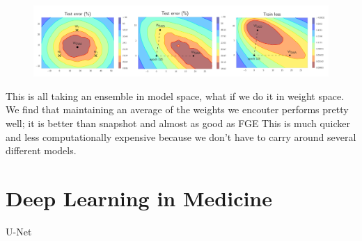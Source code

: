 \begin{figure}
    \centering
    \includegraphics[width=\textwidth]{./img/SWA.png}
    \caption{\cite{Izmailov_Podoprikhin_Garipov_Vetrov_Wilson_2018}}
    \label{fig:SWA}
\end{figure}

This is all taking an ensemble in model space, what if we do it in weight space.
We find that maintaining an average of the weights we encouter performs pretty well; it is better than snapshot and almost as good as FGE
This is much quicker and less computationally expensive because we don't have to carry around several different models.

\section{Deep Learning in Medicine}\label{deep_learning_medic_lit}
U-Net \cite{Ronneberger_Fischer_Brox_2015}